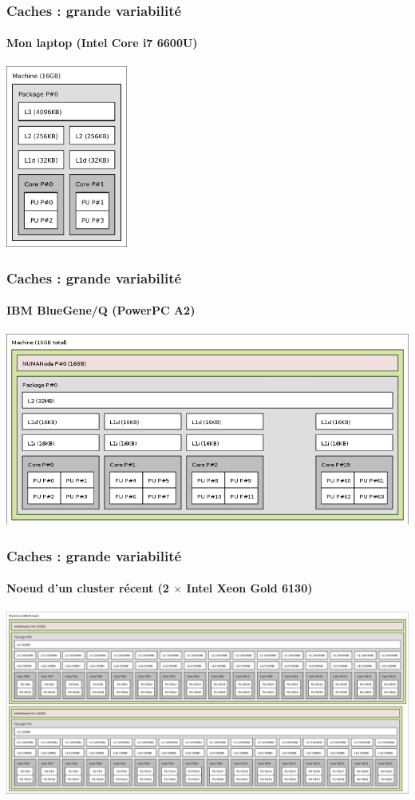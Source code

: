 \documentclass[xcolor={x11names,svgnames}, 14pt]{beamer}
\begin{document}
\begin{frame}[label=caches]
  \frametitle{Caches : grande variabilité}
  \framesubtitle{Mon laptop  (Intel Core i7 6600U)}
  \centering
  \includegraphics[height=6cm]{lstopo_laptop.pdf}
\end{frame}
  
\begin{frame}[label=caches]
  \frametitle{Caches : grande variabilité}
  \framesubtitle{IBM BlueGene/Q (PowerPC A2)}
  \centering
  \includegraphics[width=\textwidth]{lstopo_bgq.png}
\end{frame}

\begin{frame}[label=caches]
  \frametitle{Caches : grande variabilité}
  \framesubtitle{Noeud d'un cluster récent (2 $\times$ Intel Xeon Gold 6130)}
  \centering
  \includegraphics[width=\textwidth]{lstopo_gr20.pdf}
\end{frame}
\end{document}
